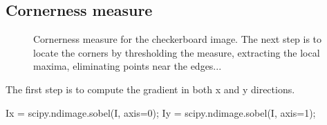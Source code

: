 \def\QRCODE{TB_IPR_TUT.IMG.harris_detector_pythonqrcode.png}
\def\QRPAGE{http://www.iptutorials.science/tree/master/TB_IPR/TUT.IMG.harris_detector/python}


\subsection{Cornerness measure}

\begin{figure}[H]
 \centering\caption{Cornerness measure for the checkerboard image. The next step is to locate the corners by thresholding the measure, extracting the local maxima, eliminating points near the edges...}%
 \hfill
 \hfill
 \label{fig:harris:python:cornerness}%
\end{figure}

The first step is to compute the gradient in both x and y directions.
\begin{python}
Ix = scipy.ndimage.sobel(I, axis=0);
Iy = scipy.ndimage.sobel(I, axis=1);
\end{python}

